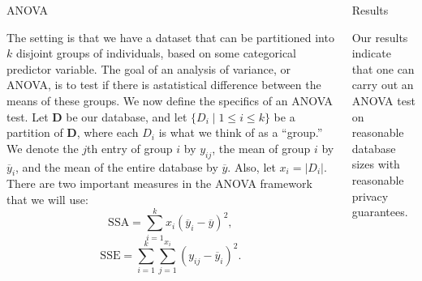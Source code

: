 \documentclass[final]{beamer}
\newlength{\onecolwid}
\newlength{\twocolwid}
\begin{document}
\begin{frame}[t]
\begin{columns}[t]
\begin{column}{\twocolwid}
\begin{columns}[t,totalwidth=\twocolwid]
\begin{column}{\onecolwid} %


\begin{block}{ANOVA}

The setting is that we have a dataset that can be partitioned into $k$ disjoint groups of 
individuals, based on some categorical predictor variable. The goal of an analysis of variance, or ANOVA, is to test if there is astatistical difference between the means of these groups. 
We now define the specifics of an ANOVA test.
Let $\textbf{D}$ be our database, and let $\{D_i \; |\; 1\leq i\leq k \}$ be a partition of 
$\textbf{D}$, where each $D_i$ is what we think of as a ``group.'' We denote the $j$th entry of group $i$ by $y_{ij}$, the mean of group $i$ by $\overline{y}_i$, and the mean of the entire 
database by $\overline{y}$. Also, let $x_i = |D_i|$. 
There are two important measures in the ANOVA framework that we will use:
\[
\text{SSA} = \sum_{i=1}^{k} x_i(\overline{y}_i - \overline{y})^2,
\]
\[
\text{SSE} = \sum_{i=1}^{k} \sum_{j=1}^{x_i} (y_{ij} - \overline{y}_i)^2.
\]

\end{block}

\end{column} %

\begin{column}{\onecolwid} %


\begin{block}{Results}

Our results indicate that one can carry out an ANOVA test on reasonable database sizes with 
reasonable privacy guarantees. 


\end{block}
\end{column}
\end{columns}
\end{column}
\end{columns}
\end{frame}
\end{document}
